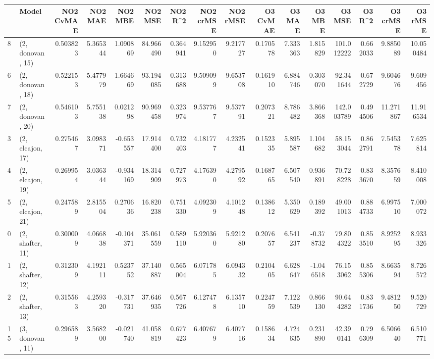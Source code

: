 \begin{tabular}{llrrrrrrrrrrrrrr}
\toprule
{} &             Model &  NO2 CvMAE &   NO2 MAE &   NO2 MBE &    NO2 MSE &   NO2 R\textasciicircum2 &  NO2 crMSE &  NO2 rMSE &  O3 CvMAE &    O3 MAE &    O3 MBE &      O3 MSE &    O3 R\textasciicircum2 &   O3 crMSE &    O3 rMSE \\
\midrule
8  &  (2, donovan, 15) &   0.503823 &  5.365344 &  1.090869 &  84.966490 &  0.364941 &   9.152950 &  9.217727 &  0.170578 &  7.333363 &  1.815829 &  101.012222 &  0.662033 &   9.885089 &  10.050484 \\
6  &  (2, donovan, 18) &   0.522153 &  5.477979 &  1.664669 &  93.194085 &  0.313688 &   9.509099 &  9.653708 &  0.161910 &  6.884746 &  0.303070 &   92.341644 &  0.672729 &   9.604676 &   9.609456 \\
7  &  (2, donovan, 20) &   0.546103 &  5.755138 &  0.021298 &  90.969458 &  0.323974 &   9.537767 &  9.537791 &  0.207321 &  8.786482 &  3.866368 &  142.003789 &  0.494506 &  11.271867 &  11.916534 \\
3  &  (2, elcajon, 17) &   0.275467 &  3.098371 & -0.653557 &  17.914400 &  0.732403 &   4.181777 &  4.232541 &  0.152335 &  5.895587 &  1.104682 &   58.153044 &  0.862791 &   7.545378 &   7.625814 \\
4  &  (2, elcajon, 19) &   0.269954 &  3.036344 & -0.934169 &  18.314909 &  0.727973 &   4.176390 &  4.279592 &  0.168765 &  6.507540 &  0.936891 &   70.728228 &  0.833670 &   8.357659 &   8.410008 \\
5  &  (2, elcajon, 21) &   0.247589 &  2.815504 &  0.270636 &  16.820238 &  0.751330 &   4.092309 &  4.101248 &  0.138612 &  5.350629 &  0.189392 &   49.001013 &  0.884733 &   6.997510 &   7.000072 \\
0  &  (2, shafter, 11) &   0.300009 &  4.066838 & -0.104371 &  35.061559 &  0.589110 &   5.920360 &  5.921280 &  0.207657 &  6.541237 & -0.378732 &   79.804322 &  0.853510 &   8.925295 &   8.933326 \\
1  &  (2, shafter, 12) &   0.312309 &  4.192111 &  0.523752 &  37.140887 &  0.565004 &   6.071785 &  6.094332 &  0.210405 &  6.628647 & -1.046518 &   76.153062 &  0.855306 &   8.663594 &   8.726572 \\
2  &  (2, shafter, 13) &   0.315563 &  4.259320 & -0.317731 &  37.646935 &  0.567726 &   6.127478 &  6.135710 &  0.224759 &  7.122539 &  0.866130 &   90.644282 &  0.831736 &   9.481250 &   9.520729 \\
15 &  (3, donovan, 11) &   0.296589 &  3.568200 & -0.021740 &  41.058819 &  0.677423 &   6.407679 &  6.407716 &  0.158634 &  4.724635 &  0.231890 &   42.390141 &  0.796309 &   6.506640 &   6.510771 \\

\end{tabular}
